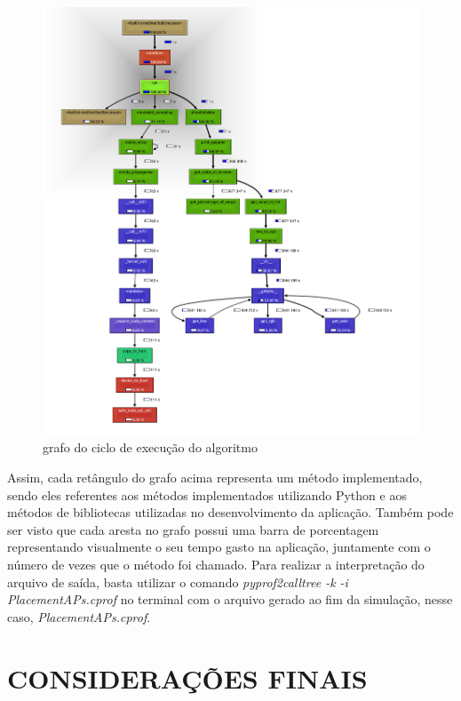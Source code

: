 \documentclass[
	12pt,				%
	openright,			%
	twoside,			%
	a4paper,			%
	english,			%
	french,				%
	spanish,			%
	brazil				%
	]{abntex2}
\begin{document}
\begin{figure}[ht]
	\caption{\label{cprofile}grafo do ciclo de execução do algoritmo	}
	\begin{center}
		\includegraphics[scale=0.4]{images/graph.jpg}
	\end{center}
\end{figure}

Assim, cada retângulo do grafo acima representa um método implementado, sendo eles referentes aos métodos implementados utilizando Python e aos métodos de bibliotecas utilizadas no desenvolvimento da aplicação. Também pode ser visto que cada aresta no grafo possui uma barra de porcentagem representando visualmente o seu tempo gasto na aplicação, juntamente com o número de vezes que o método foi chamado.  Para realizar a interpretação do arquivo de saída, basta utilizar o comando \textit{pyprof2calltree -k -i PlacementAPs.cprof} no terminal com o arquivo gerado ao fim da simulação, nesse caso, \textit{PlacementAPs.cprof}.


\chapter[CONSIDERAÇÕES FINAIS]{CONSIDERAÇÕES FINAIS}
\end{document}
